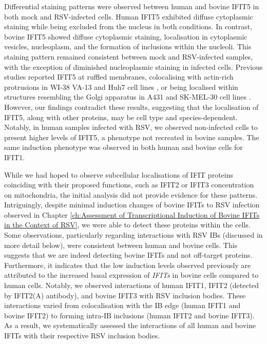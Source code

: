 Differential staining patterns were observed between human and bovine IFIT5 in both mock and RSV-infected cells. Human IFIT5 exhibited diffuse cytoplasmic staining while being excluded from the nucleus in both conditions. In contrast, bovine IFIT5 showed diffuse cytoplasmic staining, localisation in cytoplasmic vesicles, nucleoplasm, and the formation of inclusions within the nucleoli. This staining pattern remained consistent between mock and RSV-infected samples, with the exception of diminished nucleoplasmic staining in infected cells. Previous studies reported IFIT5 at ruffled membranes, colocalising with actin-rich protrusions in WI-38 VA-13 and Huh7 cell lines \cite{Katibah2013TRNAIFIT5}, or being localised within structures resembling the Golgi apparatus in A431 and SK-MEL-30 cell lines \cite{Thul2017AProteome}. However, our findings contradict these results, suggesting that the localisation of IFIT5, along with other proteins, may be cell type and species-dependent. Notably, in human samples infected with RSV, we observed non-infected cells to present higher levels of IFIT5, a phenotype not recreated in bovine samples. The same induction phenotype was observed in both human and bovine cells for IFIT1.

While we had hoped to observe subcellular localisations of IFIT proteins coinciding with their proposed functions, such as IFIT2 or IFIT3 concentration on mitochondria, the initial analysis did not provide evidence for these patterns. Intriguingly, despite minimal induction changes of bovine IFITs to RSV infection observed in Chapter \ref{ch:Assessment of Transcriptional Induction of Bovine IFITs in the Context of RSV}, we were able to detect these proteins within the cells. Some observations, particularly regarding interactions with RSV IBs (discussed in more detail below), were consistent between human and bovine cells. This suggests that we are indeed detecting bovine IFITs and not off-target proteins. Furthermore, it indicates that the low induction levels observed previously are attributed to the increased basal expression of \textit{IFITs} in bovine cells compared to human cells. Notably, we observed interactions of human IFIT1, IFIT2 (detected by IFIT2(A) antibody), and bovine IFIT3 with RSV inclusion bodies. These interactions varied from colocalisation with the IB edge (human IFIT1 and bovine IFIT2) to forming intra-IB inclusions (human IFIT2 and bovine IFIT3). As a result, we systematically assessed the interactions of all human and bovine IFITs with their respective RSV inclusion bodies.

